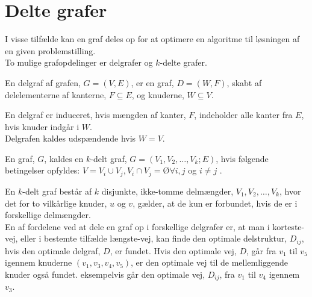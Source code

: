 \section{Delte grafer}
I visse tilfælde kan en graf deles op for at optimere en algoritme til løsningen af en given problemstilling. \\
To mulige grafopdelinger er delgrafer og $k$-delte grafer.

\begin{defn}	 \label{defn:delgraf} %
En delgraf af grafen, $G= (V,E)$, er en graf, $D = (W,F)$, skabt af delelementerne af kanterne, $F \subseteq E$, og knuderne, $W \subseteq V$.
\end{defn}

En delgraf er induceret, hvis mængden af kanter, $F$, indeholder alle kanter fra $E$, hvis knuder indgår i $W$. \\
Delgrafen kaldes udspændende hvis $W=V$. 

\begin{defn} \label{defn:k-delt} %
En graf, $G$, kaldes en $k$-delt graf, $G = (V_1, V_2, \ldots, V_k; E)$, hvis følgende betingelser opfyldes: $V= V_i \cup V_j , V_i \cap V_j = Ø \forall i,j$ og $i\neq j$ .
\end{defn}

En $k$-delt graf består af $k$ disjunkte, ikke-tomme delmængder, $V_1, V_2, \ldots, V_k$, hvor det for to vilkårlige knuder, $u$ og $v$, gælder, at de kun er forbundet, hvis de er i forskellige delmængder. \\


En af fordelene ved at dele en graf op i forskellige delgrafer er, at man i korteste-vej, eller i bestemte tilfælde længste-vej, kan finde den optimale delstruktur, $D_{ij}$, hvis den optimale delgraf, $D$, er fundet. Hvis den optimale vej, $D$, går fra $v_1$ til $v_5$ igennem knuderne $(v_1, v_3, v_4, v_5)$, er den optimale vej til de mellemliggende knuder også fundet. eksempelvis går den optimale vej, $D_{ij}$, fra $v_1$ til $v_4$ igennem $v_3$.


